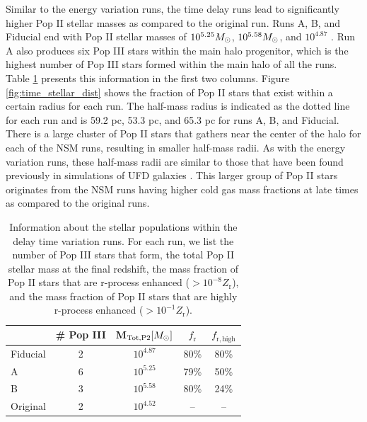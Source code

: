 \documentclass[fleqn,usenatbib]{mnras}
\begin{document}
Similar to the energy variation runs, the time delay runs lead to significantly higher Pop II stellar masses as compared to the original run. Runs A, B, and Fiducial end with Pop II stellar masses of $10^{5.25}\Ms$, $10^{5.58} \Ms$, and $10^{4.87}$ \Ms. Run A also produces six Pop III stars within the main halo progenitor, which is the highest number of Pop III stars formed within the main halo of all the runs. Table \ref{tab:time_stellar} presents this information in the first two columns. Figure \ref{fig:time_stellar_dist} shows the fraction of Pop II stars that exist within a certain radius for each run. The half-mass radius is indicated as the dotted line for each run and is 59.2 pc, 53.3 pc, and 65.3 pc for runs A, B, and Fiducial. There is a large cluster of Pop II stars that gathers near the center of the halo for each of the NSM runs, resulting in smaller half-mass radii. As with the energy variation runs, these half-mass radii are similar to those that have been found previously in simulations of UFD galaxies \citep{Ricotti16}. This larger group of Pop II stars originates from the NSM runs having higher cold gas mass fractions at late times as compared to the original runs. 

\begin{table}
	\centering
	\begin{tabular}{lcccc} 
		\hline
		 & \# Pop III & M$_{\mathrm{Tot, P2}} [\Ms]$ & $f_{\mathrm{r}}$ & $f_{\mathrm{r, high}}$ \\
		\hline
		Fiducial & 2 & $10^{4.87}$ & 80\% & 80\% \\
		A & 6 & $10^{5.25}$ & 79\% & 50\% \\
		B & 3 & $10^{5.58}$ & 80\% & 24\% \\
		Original & 2 & $10^{4.52}$ & -- & -- \\
		\hline
	\end{tabular}
	\caption[Information about the stellar populations within the delay time variation runs.]{Information about the stellar populations within the delay time variation runs. For each run, we list the number of Pop III stars that form, the total Pop II stellar mass at the final redshift, the mass fraction of Pop II stars that are r-process enhanced ($> 10^{-8} Z_{\mathrm{r}}$), and the mass fraction of Pop II stars that are highly r-process enhanced ($> 10^{-1} Z_{\mathrm{r}}$).}
	\label{tab:time_stellar}
\end{table}
\end{document}
